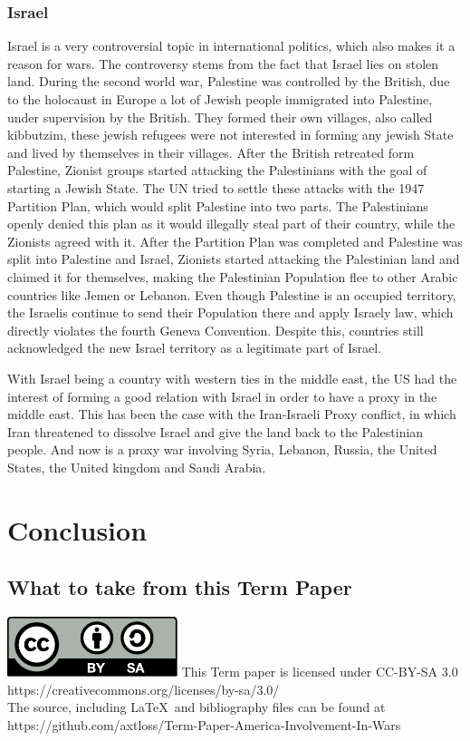 \documentclass[12pt,a4paper]{article}
\begin{document}
		\subsubsection{Israel} %
		Israel is a very controversial topic in international politics, which also makes it a reason for wars. The controversy stems from the fact that Israel lies on stolen land. 
		During the second world war, Palestine was controlled by the British, due to the holocaust in Europe a lot of Jewish people immigrated into Palestine, under supervision by the British. They formed their own villages, also called kibbutzim, these jewish refugees were not interested in forming any jewish State and lived by themselves in their villages. After the British retreated form Palestine, Zionist groups started attacking the Palestinians with the goal of starting a Jewish State. The UN tried to settle these attacks with the 1947 Partition Plan, which would split Palestine into two parts. The Palestinians openly denied this plan as it would illegally steal part of their country, while the Zionists agreed with it. 
		After the Partition Plan was completed and Palestine was split into Palestine and Israel, Zionists started attacking the Palestinian land and claimed it for themselves, making the Palestinian Population flee to other Arabic countries like Jemen or Lebanon. 
		Even though Palestine is an occupied territory, the Israelis continue to send their Population there and apply Israely law, which directly violates the fourth Geneva Convention. Despite this, countries still acknowledged the new Israel territory as a legitimate part of Israel.
		
		With Israel being a country with western ties in the middle east, the US had the interest of forming a good relation with Israel in order to have a proxy in the middle east. This has been the case with the Iran-Israeli Proxy conflict, in which Iran threatened to dissolve Israel and give the land back to the Palestinian people. And now is a proxy war involving Syria, Lebanon, Russia, the United States, the United kingdom and Saudi Arabia.
		
	\section{Conclusion}
		\subsection{What to take from this Term Paper}
		
		
		
	\newpage
	{
		{}
		
		\includegraphics{by-sa.pdf}
		This Term paper is licensed under CC-BY-SA 3.0\\
		https://creativecommons.org/licenses/by-sa/3.0/\\The source, including \LaTeX\  and bibliography files can be found at https://github.com/axtloss/Term-Paper-America-Involvement-In-Wars
	}
\end{document}
